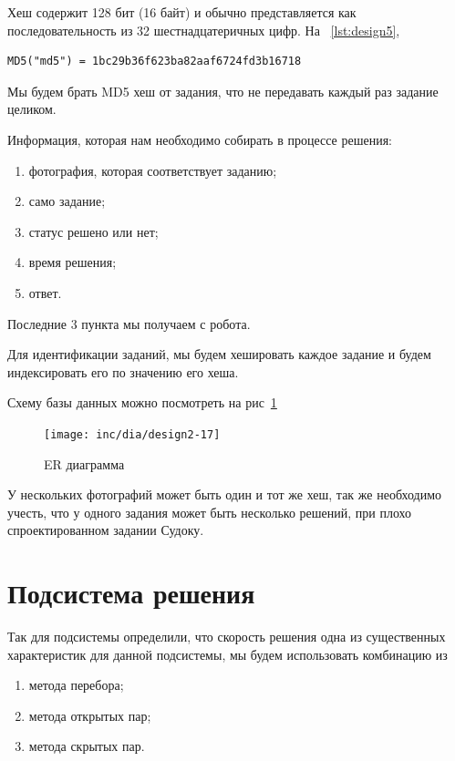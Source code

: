 Хеш содержит 128 бит (16 байт) и обычно представляется как последовательность из 32 шестнадцатеричных цифр. На ~\ref{lst:design5},

\begin{lstlisting}[caption={Пример MD5 хеша}, label=lst:design5]
MD5("md5") = 1bc29b36f623ba82aaf6724fd3b16718
\end{lstlisting}

Мы будем брать MD5 хеш от задания, что не передавать каждый раз задание целиком.

Информация, которая нам необходимо собирать в процессе решения:
\begin{enumerate}
  \item фотография, которая соответствует заданию;
  \item само задание;
  \item статус решено или нет;
  \item время решения;
  \item ответ.
\end{enumerate}

Последние 3 пункта мы получаем с робота.

Для идентификации заданий, мы будем хешировать каждое задание и будем индексировать его по значению его хеша.

Схему базы данных можно посмотреть на рис~\ref{fig:fig24}
\begin{figure}[ht!]
  \centering
  \texttt{[image: inc/dia/design2-17]}
  \caption{ER диаграмма}
  \label{fig:fig24}
\end{figure}


У нескольких фотографий может быть один и тот же хеш, так же необходимо учесть, что у одного задания может быть несколько решений, при плохо спроектированном задании Судоку.

\section{Подсистема решения}

Так для подсистемы определили, что скорость решения одна из существенных характеристик для данной подсистемы, мы будем использовать комбинацию из 

\begin{enumerate}
  \item метода перебора;
  \item метода открытых пар;
  \item метода скрытых пар.
\end{enumerate}

